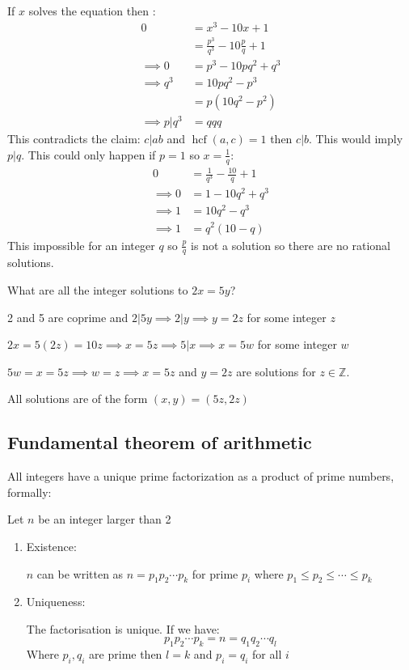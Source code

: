 \documentclass{article}
\newcommand{\bb}[1]{\mathbb{#1}}
\newcommand{\hcf}{\operatorname{hcf}}
\begin{document}
If \(x\) solves the equation then :
\begin{align*}
0&=x^3-10x+1\\
&=\frac{p^3}{q^3}-10\frac pq +1\\
\implies 0 &= p^3-10pq^2+q^3\\
\implies q^3 &= 10pq^2-p^3\\
&= p(10q^2-p^2)\\
\implies p|q^3 &= qqq
\end{align*}
This contradicts the claim: \(c|ab\) and \(\hcf(a,c)=1\) then \(c|b\). This would imply \(p|q\). This could only happen if \(p=1\) so \(x=\frac 1q\):
\begin{align*}
0 &= \frac{1}{q^3} - \frac{10}{q} + 1\\
\implies 0 &= 1-10q^2+q^3\\
\implies 1 &= 10q^2 - q^3\\
\implies 1 &= q^2(10-q)
\end{align*}
This impossible for an integer \(q\) so \(\frac pq\) is not a solution so there are no rational solutions.

What are all the integer solutions to \(2x=5y\)?

2 and 5 are coprime and \(2|5y\implies2|y\implies y=2z\) for some integer \(z\)

\(2x=5(2z)=10z\implies x = 5z\implies 5|x\implies x=5w\) for some integer \(w\)

\(5w = x = 5z\implies w = z\implies x = 5z\) and \( y = 2z\) are solutions for \(z\in\bb Z\).

All solutions are of the form \((x,y) = (5z, 2z)\)

\subsection*{Fundamental theorem of arithmetic}

All integers have a unique prime factorization as a product of prime numbers, formally:

\begin{displayquote}
Let \(n\) be an integer larger than 2
\begin{enumerate}
\item Existence:

\(n\) can be written as \(n = p_1p_2\dotsm p_k\) for prime \(p_i\) where \(p_1\le p_2\le\dotsb\le p_k\)

\item Uniqueness:

The factorisation is unique. If we have:
\[p_1p_2\dotsm p_k = n = q_1q_2\dotsm q_l\]
Where \(p_i,q_i\) are prime then \(l=k\) and \(p_i=q_i\) for all \(i\)
\end{enumerate}
\end{displayquote}
\end{document}
